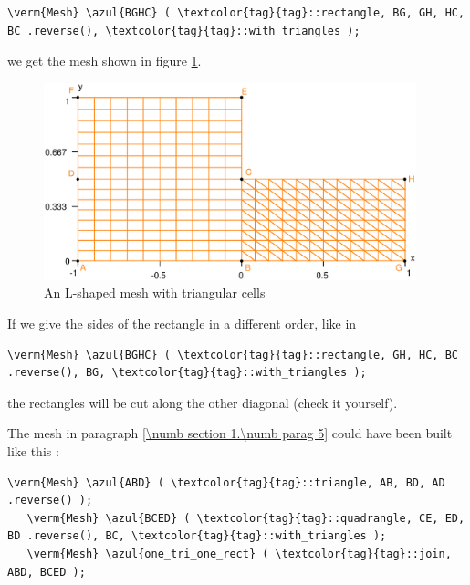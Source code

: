 \begin{Verbatim}[commandchars=\\\{\},formatcom=\small\tt,baselinestretch=0.94]
   \verm{Mesh} \azul{BGHC} ( \textcolor{tag}{tag}::rectangle, BG, GH, HC, BC .reverse(), \textcolor{tag}{tag}::with_triangles );
\end{Verbatim}

\noindent we get the mesh shown in figure \ref{\numb section 2.\numb fig 3}.

\begin{figure}[ht] \centering
  \includegraphics[width=108mm]{L-shaped-tri}
  \caption{An L-shaped mesh with triangular cells}
  \label{\numb section 2.\numb fig 3}
\end{figure}

If we give the sides of the rectangle in a different order, like in

\begin{Verbatim}[commandchars=\\\{\},formatcom=\small\tt,baselinestretch=0.94]
   \verm{Mesh} \azul{BGHC} ( \textcolor{tag}{tag}::rectangle, GH, HC, BC .reverse(), BG, \textcolor{tag}{tag}::with_triangles );
\end{Verbatim}

\noindent the rectangles will be cut along the other diagonal (check it yourself).

The mesh in paragraph \ref{\numb section 1.\numb parag 5} could have been built like this :

\begin{Verbatim}[commandchars=\\\{\},formatcom=\small\tt,baselinestretch=0.94]
   \verm{Mesh} \azul{ABD} ( \textcolor{tag}{tag}::triangle, AB, BD, AD .reverse() );
   \verm{Mesh} \azul{BCED} ( \textcolor{tag}{tag}::quadrangle, CE, ED, BD .reverse(), BC, \textcolor{tag}{tag}::with_triangles );
   \verm{Mesh} \azul{one_tri_one_rect} ( \textcolor{tag}{tag}::join, ABD, BCED );
\end{Verbatim}


